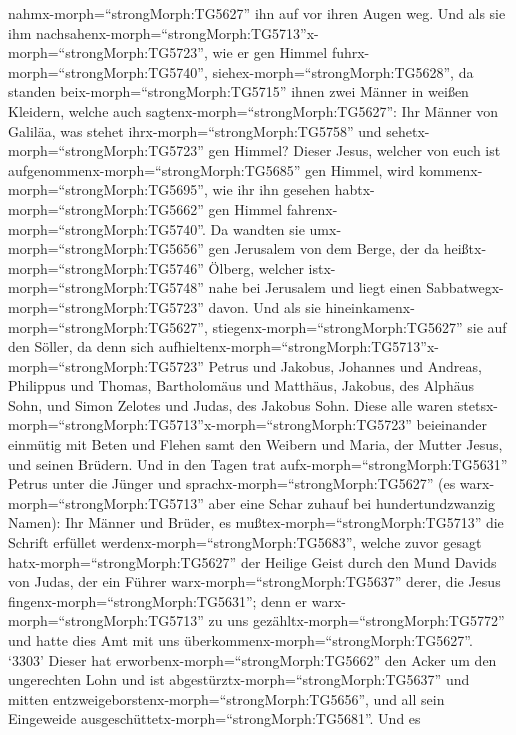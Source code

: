 nahmx-morph=``strongMorph:TG5627'' ihn auf vor ihren Augen weg.
 Und als sie ihm
nachsahenx-morph=``strongMorph:TG5713''x-morph=``strongMorph:TG5723'',
wie er gen Himmel fuhrx-morph=``strongMorph:TG5740'',
siehex-morph=``strongMorph:TG5628'', da standen
beix-morph=``strongMorph:TG5715'' ihnen zwei Männer in weißen Kleidern,
 welche auch sagtenx-morph=``strongMorph:TG5627'': Ihr
Männer von Galiläa, was stehet ihrx-morph=``strongMorph:TG5758'' und
sehetx-morph=``strongMorph:TG5723'' gen Himmel? Dieser Jesus, welcher
von euch ist aufgenommenx-morph=``strongMorph:TG5685'' gen Himmel, wird
kommenx-morph=``strongMorph:TG5695'', wie ihr ihn gesehen
habtx-morph=``strongMorph:TG5662'' gen Himmel
fahrenx-morph=``strongMorph:TG5740''.  Da wandten sie
umx-morph=``strongMorph:TG5656'' gen Jerusalem von dem Berge, der da
heißtx-morph=``strongMorph:TG5746'' Ölberg, welcher
istx-morph=``strongMorph:TG5748'' nahe bei Jerusalem und liegt einen
Sabbatwegx-morph=``strongMorph:TG5723'' davon.  Und als sie
hineinkamenx-morph=``strongMorph:TG5627'',
stiegenx-morph=``strongMorph:TG5627'' sie auf den Söller, da denn sich
aufhieltenx-morph=``strongMorph:TG5713''x-morph=``strongMorph:TG5723''
Petrus und Jakobus, Johannes und Andreas, Philippus und Thomas,
Bartholomäus und Matthäus, Jakobus, des Alphäus Sohn, und Simon Zelotes
und Judas, des Jakobus Sohn.  Diese alle waren
stetsx-morph=``strongMorph:TG5713''x-morph=``strongMorph:TG5723''
beieinander einmütig mit Beten und Flehen samt den Weibern und Maria,
der Mutter Jesus, und seinen Brüdern.  Und in den Tagen
trat aufx-morph=``strongMorph:TG5631'' Petrus unter die Jünger und
sprachx-morph=``strongMorph:TG5627'' (es
warx-morph=``strongMorph:TG5713'' aber eine Schar zuhauf bei
hundertundzwanzig Namen):  Ihr Männer und Brüder, es
mußtex-morph=``strongMorph:TG5713'' die Schrift erfüllet
werdenx-morph=``strongMorph:TG5683'', welche zuvor gesagt
hatx-morph=``strongMorph:TG5627'' der Heilige Geist durch den Mund
Davids von Judas, der ein Führer warx-morph=``strongMorph:TG5637''
derer, die Jesus fingenx-morph=``strongMorph:TG5631''; 
denn er warx-morph=``strongMorph:TG5713'' zu uns
gezähltx-morph=``strongMorph:TG5772'' und hatte dies Amt mit uns
überkommenx-morph=``strongMorph:TG5627''.  `3303' Dieser
hat erworbenx-morph=``strongMorph:TG5662'' den Acker um den ungerechten
Lohn und ist abgestürztx-morph=``strongMorph:TG5637'' und mitten
entzweigeborstenx-morph=``strongMorph:TG5656'', und all sein Eingeweide
ausgeschüttetx-morph=``strongMorph:TG5681''.  Und es
